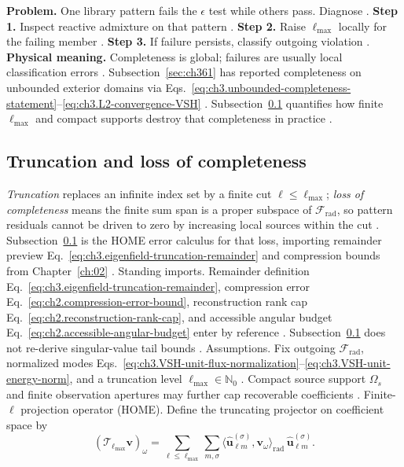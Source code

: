 \textbf{Problem.} One library pattern fails the \(\epsilon\) test while others pass. Diagnose .
\textbf{Step 1.} Inspect reactive admixture on that pattern .
\textbf{Step 2.} Raise \(\ell_{\max}\) locally for the failing member .
\textbf{Step 3.} If failure persists, classify outgoing violation .
\textbf{Physical meaning.} Completeness is global; failures are usually local classification errors .
Subsection~\ref{sec:ch361} has reported completeness on unbounded exterior domains via
Eqs.~\eqref{eq:ch3.unbounded-completeness-statement}--\eqref{eq:ch3.L2-convergence-VSH}
. Subsection~\ref{sec:ch362} quantifies how finite \(\ell_{\max}\) and compact
supports destroy that completeness in practice .
\subsection{Truncation and loss of completeness}
\label{sec:ch362}
\emph{Truncation} replaces an infinite index set by a finite cut \(\ell\le\ell_{\max}\);
\emph{loss of completeness} means the finite sum span is a proper subspace of \(\mathcal{F}_{\mathrm{rad}}\), so
pattern residuals cannot be driven to zero by increasing local sources within the cut \cite{harrington2001}.
Subsection~\ref{sec:ch362} is the HOME error calculus for that loss, importing remainder preview
Eq.~\eqref{eq:ch3.eigenfield-truncation-remainder} and compression bounds from Chapter~\ref{ch:02}
\cite{hansen1988}.
Standing imports. Remainder definition Eq.~\eqref{eq:ch3.eigenfield-truncation-remainder}, compression error
Eq.~\eqref{eq:ch2.compression-error-bound}, reconstruction rank cap Eq.~\eqref{eq:ch2.reconstruction-rank-cap},
and accessible angular budget Eq.~\eqref{eq:ch2.accessible-angular-budget} enter by reference
\cite{harrington2001}. Subsection~\ref{sec:ch362} does not re-derive singular-value tail bounds
\cite{harrington2001}.
Assumptions. Fix outgoing \(\mathcal{F}_{\mathrm{rad}}\), normalized modes
Eqs.~\eqref{eq:ch3.VSH-unit-flux-normalization}--\eqref{eq:ch3.VSH-unit-energy-norm}, and a truncation level
\(\ell_{\max}\in\mathbb{N}_{0}\) \cite{hansen1988}. Compact source support \(\Omega_{s}\) and finite
observation apertures may further cap recoverable coefficients \cite{harrington2001}.
Finite-\(\ell\) projection operator (HOME). Define the truncating projector on coefficient space by
\begin{equation}
\label{eq:ch3.ellmax-truncation-projector}
(\mathcal{T}_{\ell_{\max}}\mathbf{v})_\omega
=
\sum_{\ell\le\ell_{\max}}\sum_{m,\sigma}
\langle\widehat{\mathbf{u}}_{\ell m}^{(\sigma)},\mathbf{v}_\omega\rangle_{\mathrm{rad}}\,
\widehat{\mathbf{u}}_{\ell m}^{(\sigma)}.
\end{equation}
